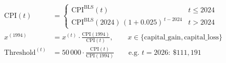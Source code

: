 \begin{align}
\text{CPI}(t) &= \begin{cases} \text{CPI}^{\text{BLS}}(t) & t \le 2024 \\ \text{CPI}^{\text{BLS}}(2024)\,(1 + 0.025)^{\,t - 2024} & t > 2024 \end{cases} \\
x^{(1994)} &= x^{(t)} \cdot \frac{\text{CPI}(1994)}{\text{CPI}(t)}, \qquad x \in \{\text{capital\_gain}, \text{capital\_loss}\} \\
\text{Threshold}^{(t)} &= 50\,000 \cdot \frac{\text{CPI}(t)}{\text{CPI}(1994)} \qquad \text{e.g. } t = 2026:\ \$111,191
\end{align}

